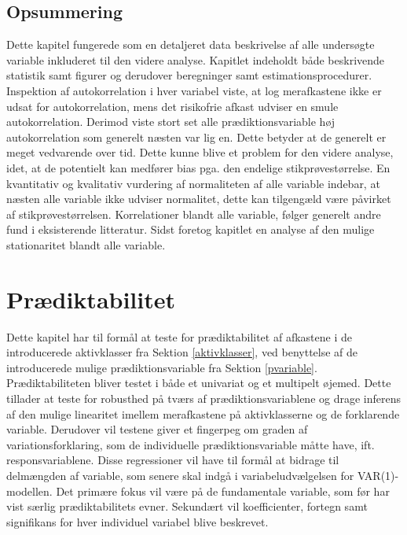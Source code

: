 \documentclass[
  a4paper,
  oneside]{memoir}
\begin{document}
\begin{table}[H]
\begin{threeparttable}
\begin{tablenotes}
\end{tablenotes}
\end{threeparttable}
\end{table}

\hypertarget{ops}{%
\section{Opsummering}\label{ops}}

Dette kapitel fungerede som en detaljeret data beskrivelse af alle undersøgte variable inkluderet til den videre analyse. Kapitlet indeholdt både beskrivende statistik samt figurer og derudover beregninger samt estimationsprocedurer. Inspektion af autokorrelation i hver variabel viste, at log merafkastene ikke er udsat for autokorrelation, mens det risikofrie afkast udviser en smule autokorrelation. Derimod viste stort set alle prædiktionsvariable høj autokorrelation som generelt næsten var lig en. Dette betyder at de generelt er meget vedvarende over tid. Dette kunne blive et problem for den videre analyse, idet, at de potentielt kan medfører bias pga. den endelige stikprøvestørrelse. En kvantitativ og kvalitativ vurdering af normaliteten af alle variable indebar, at næsten alle variable ikke udviser normalitet, dette kan tilgengæld være påvirket af stikprøvestørrelsen. Korrelationer blandt alle variable, følger generelt andre fund i eksisterende litteratur. Sidst foretog kapitlet en analyse af den mulige stationaritet blandt alle variable.

\hypertarget{predikta}{%
\chapter{Prædiktabilitet}\label{predikta}}

Dette kapitel har til formål at teste for prædiktabilitet af afkastene i de introducerede aktivklasser fra Sektion \ref{aktivklasser}, ved benyttelse af de introducerede mulige prædiktionsvariable fra Sektion \ref{pvariable}. Prædiktabiliteten bliver testet i både et univariat og et multipelt øjemed. Dette tillader at teste for robusthed på tværs af prædiktionsvariablene og drage inferens af den mulige linearitet imellem merafkastene på aktivklasserne og de forklarende variable. Derudover vil testene giver et fingerpeg om graden af variationsforklaring, som de individuelle prædiktionsvariable måtte have, ift. responsvariablene. Disse regressioner vil have til formål at bidrage til delmængden af variable, som senere skal indgå i variabeludvælgelsen for VAR(1)-modellen. Det primære fokus vil være på de fundamentale variable, som før har vist særlig prædiktabilitets evner. Sekundært vil koefficienter, fortegn samt signifikans for hver individuel variabel blive beskrevet.
\end{document}

